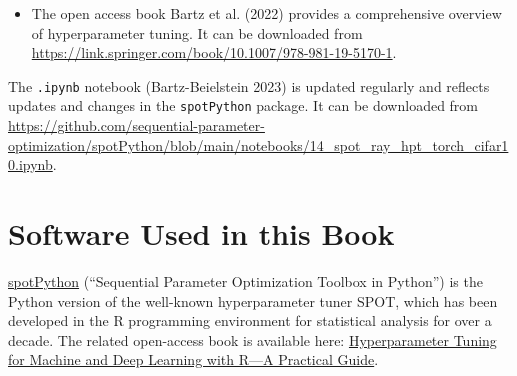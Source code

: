 \documentclass[
  letterpaper,
  DIV=11,
  numbers=noendperiod]{scrreprt}
\providecommand{\tightlist}{%
  \setlength{\itemsep}{0pt}\setlength{\parskip}{0pt}}\usepackage{longtable,booktabs,array}
\begin{document}
\begin{tcolorbox}[enhanced jigsaw, titlerule=0mm, colbacktitle=quarto-callout-tip-color!10!white, coltitle=black, arc=.35mm, toptitle=1mm, colback=white, left=2mm, opacityback=0, bottomtitle=1mm, bottomrule=.15mm, breakable, opacitybacktitle=0.6, colframe=quarto-callout-tip-color-frame, rightrule=.15mm, toprule=.15mm, leftrule=.75mm, title=\textcolor{quarto-callout-tip-color}{\faLightbulb}\hspace{0.5em}{Hyperparameter Tuning Reference}]

\begin{itemize}
\tightlist
\item
  The open access book Bartz et al. (2022) provides a comprehensive
  overview of hyperparameter tuning. It can be downloaded from
  \url{https://link.springer.com/book/10.1007/978-981-19-5170-1}.
\end{itemize}

\end{tcolorbox}

\begin{tcolorbox}[enhanced jigsaw, titlerule=0mm, colbacktitle=quarto-callout-note-color!10!white, coltitle=black, arc=.35mm, toptitle=1mm, colback=white, left=2mm, opacityback=0, bottomtitle=1mm, bottomrule=.15mm, breakable, opacitybacktitle=0.6, colframe=quarto-callout-note-color-frame, rightrule=.15mm, toprule=.15mm, leftrule=.75mm, title=\textcolor{quarto-callout-note-color}{\faInfo}\hspace{0.5em}{Note}]

The \texttt{.ipynb} notebook (Bartz-Beielstein 2023) is updated
regularly and reflects updates and changes in the \texttt{spotPython}
package. It can be downloaded from
\url{https://github.com/sequential-parameter-optimization/spotPython/blob/main/notebooks/14_spot_ray_hpt_torch_cifar10.ipynb}.

\end{tcolorbox}

\hypertarget{software-used-in-this-book}{%
\section*{Software Used in this Book}\label{software-used-in-this-book}}


\href{https://github.com/sequential-parameter-optimization/spotPython}{spotPython}
(``Sequential Parameter Optimization Toolbox in Python'') is the Python
version of the well-known hyperparameter tuner SPOT, which has been
developed in the R programming environment for statistical analysis for
over a decade. The related open-access book is available here:
\href{https://link.springer.com/book/10.1007/978-981-19-5170-1}{Hyperparameter
Tuning for Machine and Deep Learning with R---A Practical Guide}.
\end{document}
